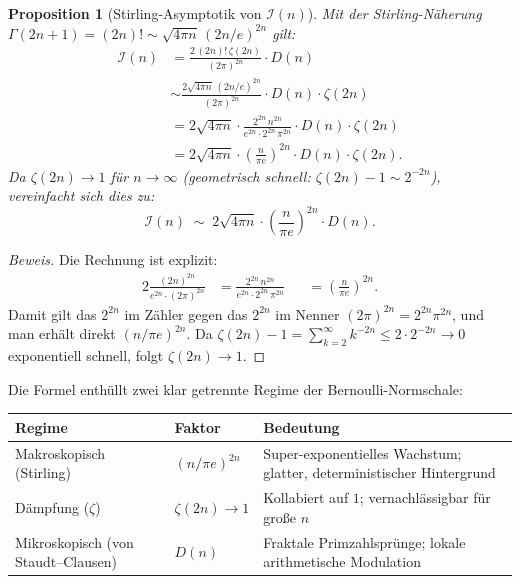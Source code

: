 \documentclass[12pt,a4paper]{article}
\newtheorem{proposition}[definition]{Proposition}
\newenvironment{beweis}{\begin{proof}[Beweis]}{\end{proof}}
\newcommand{\In}{\mathcal{I}}      %
\newcommand{\Denom}[1]{D(#1)}     %
\begin{document}
\begin{proposition}[Stirling-Asymptotik von $\In(n)$]
\label{prop:stirling}
Mit der Stirling-Näherung $\Gamma(2n+1) = (2n)! \sim \sqrt{4\pi n}\,(2n/e)^{2n}$ gilt:
\begin{align*}
  \In(n) &= \frac{2\,(2n)!\,\zeta(2n)}{(2\pi)^{2n}} \cdot \Denom{n} \\
         &\sim \frac{2\sqrt{4\pi n}\,(2n/e)^{2n}}{(2\pi)^{2n}} \cdot \Denom{n}
               \cdot \zeta(2n) \\
         &= 2\sqrt{4\pi n}\cdot \frac{2^{2n}\,n^{2n}}{e^{2n}\cdot 2^{2n}\,\pi^{2n}}
            \cdot \Denom{n}\cdot \zeta(2n) \\
         &= 2\sqrt{4\pi n}\cdot \left(\frac{n}{\pi e}\right)^{2n}
            \cdot \Denom{n}\cdot \zeta(2n).
\end{align*}
Da $\zeta(2n) \to 1$ für $n \to \infty$ (geometrisch schnell:
$\zeta(2n) - 1 \sim 2^{-2n}$), vereinfacht sich dies zu:
\[
  \boxed{\In(n) \;\sim\; 2\sqrt{4\pi n}\cdot \left(\frac{n}{\pi e}\right)^{2n}
  \cdot \Denom{n}.}
\]
\end{proposition}

\begin{beweis}
Die Rechnung ist explizit:
\begin{alignat*}{2}
  \frac{(2n)^{2n}}{e^{2n}\cdot(2\pi)^{2n}}
  &= \frac{2^{2n}\,n^{2n}}{e^{2n}\cdot 2^{2n}\,\pi^{2n}}
  &&= \left(\frac{n}{\pi e}\right)^{2n}.
\end{alignat*}
Damit gilt das $2^{2n}$ im Zähler gegen das $2^{2n}$ im Nenner $(2\pi)^{2n} = 2^{2n}\pi^{2n}$,
und man erhält direkt $(n/\pi e)^{2n}$.
Da $\zeta(2n) - 1 = \sum_{k=2}^\infty k^{-2n} \leq 2\cdot 2^{-2n} \to 0$
exponentiell schnell, folgt $\zeta(2n) \to 1$.
\end{beweis}

Die Formel enthüllt zwei klar getrennte Regime der Bernoulli-Normschale:

\medskip
\begin{center}
\renewcommand{\arraystretch}{1.4}
\begin{tabular}{p{3.8cm} p{4.5cm} p{5cm}}
\toprule
\textbf{Regime} & \textbf{Faktor} & \textbf{Bedeutung} \\
\midrule
Makroskopisch (Stirling) & $(n/\pi e)^{2n}$ &
  Super-exponentielles Wachstum; glatter, deterministischer Hintergrund \\
Dämpfung ($\zeta$) & $\zeta(2n) \to 1$ &
  Kollabiert auf $1$; vernachlässigbar für große $n$ \\
Mikroskopisch (von Staudt--Clausen) & $\Denom{n}$ &
  Fraktale Primzahlsprünge; lokale arithmetische Modulation \\
\bottomrule
\end{tabular}
\end{center}
\end{document}
